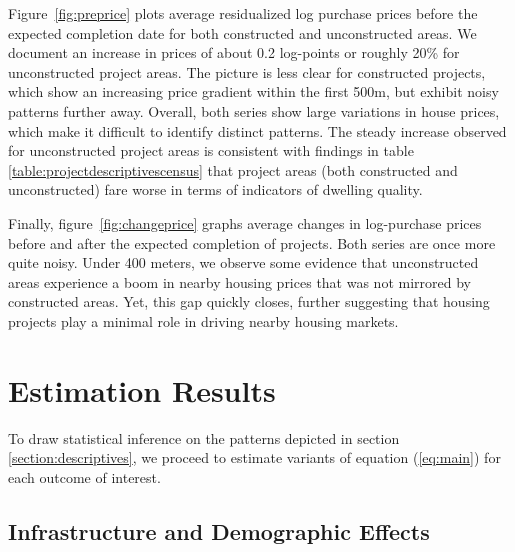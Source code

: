 \documentclass[12pt]{article}
\begin{document}
Figure~\ref{fig:preprice} plots average residualized log purchase prices before the expected completion date for both constructed and unconstructed areas. We document an increase in prices of about 0.2 log-points or roughly 20\% for unconstructed project areas. The picture is less clear for constructed projects, which show an increasing price gradient within the first 500m, but exhibit noisy patterns further away.  Overall, both series show large variations in house prices, which make it difficult to identify  distinct patterns. The steady increase observed for unconstructed project areas is consistent with findings in table \ref{table:projectdescriptivescensus} that project areas (both constructed and unconstructed) fare worse in terms of indicators of dwelling quality.

Finally, figure~\ref{fig:changeprice} graphs average changes in log-purchase prices before and after the expected completion of projects. Both series are once more quite noisy. Under 400 meters, we observe some evidence that unconstructed areas experience a boom in nearby housing prices that was not mirrored by constructed areas.  Yet, this gap quickly closes, further suggesting that housing projects play a minimal role in driving nearby housing markets.


\section{Estimation Results}\label{section:results}

To draw statistical inference on the patterns depicted in section \ref{section:descriptives}, we proceed to estimate variants of equation (\ref{eq:main}) for each outcome of interest. 


\subsection{Infrastructure and Demographic Effects}\label{section:resultscensus}

\end{document}
